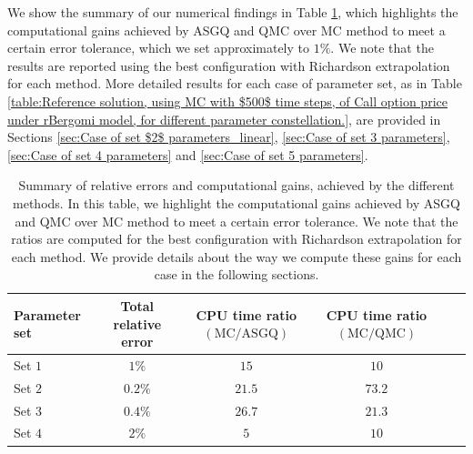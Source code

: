 We show  the summary of our numerical findings in Table \ref{table:Summary of our numerical results.}, which  highlights the computational gains achieved by ASGQ and QMC over MC method to meet a certain error tolerance, which we set approximately to $1\%$. We note that the results are reported using the best configuration with Richardson extrapolation for each method. More detailed results for each case of parameter set, as in Table \ref{table:Reference solution, using MC with $500$ time steps, of Call option price under rBergomi model, for different parameter constellation.},  are provided in  Sections \ref{sec:Case of set $2$ parameters_linear}, \ref{sec:Case of set 3 parameters}, \ref{sec:Case of set 4 parameters} and \ref{sec:Case of set 5 parameters}. 
\FloatBarrier
\begin{table}[!h]
	\centering
	\begin{small}
	\begin{tabular}{l*{4}{c}r}
	\toprule[1.5pt]
		Parameter set              &  Total relative error  & CPU time ratio $\left(\text{MC}/ \text{ASGQ} \right)$ & CPU time ratio  $\left(\text{MC}/ \text{QMC} \right)$\\
		\hline
			Set $1$  &  $1\%$&  $ 15$ &  $10$\\	
           	
              \hline
            Set $2$     &  $0.2\%$&  $21.5$ &  $73.2$\\		
				 \hline
					Set $3$    &  $0.4\%$&  $26.7$ &  $21.3$\\	
					\hline
						Set $4$  &  $2\%$&  $5$ &  $10$\\	
		\bottomrule[1.25pt]
	\end{tabular}
\end{small}
	\caption{Summary of relative errors and computational gains, achieved by the different methods. In this table, we highlight the computational gains achieved by ASGQ and QMC over MC method to meet a certain error tolerance. We note that the ratios are computed for the best configuration with Richardson extrapolation for each method. We provide details about the way we compute these gains for each case in the following sections.}
	\label{table:Summary of our numerical results.}
\end{table}
\FloatBarrier

	
	



